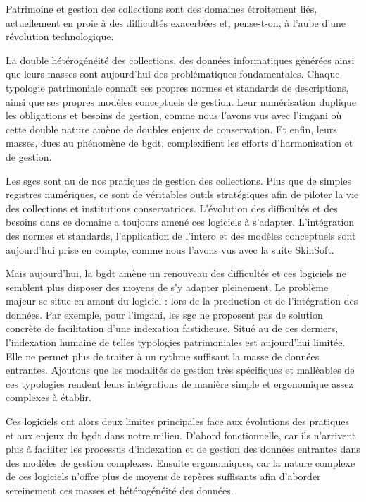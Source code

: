 
Patrimoine et gestion des collections sont des domaines étroitement liés, actuellement en proie à des difficultés exacerbées et, pense-t-on, à l'aube d'une révolution technologique. 

La double hétérogénéité des collections, des données informatiques générées ainsi que leurs masses sont aujourd'hui des problématiques fondamentales. Chaque typologie patrimoniale connaît ses propres normes et standards de descriptions, ainsi que ses propres modèles conceptuels de gestion. Leur numérisation duplique les obligations et besoins de gestion, comme nous l'avons vus avec l'\gls{imgani} où cette double nature amène de doubles enjeux de conservation. Et enfin, leurs masses, dues au phénomène de \gls{bgdt}, complexifient les efforts d'harmonisation et de gestion. 

Les \glspl{sgc} sont au \coeur de nos pratiques de gestion des collections. Plus que de simples registres numériques, ce sont de véritables outils stratégiques afin de piloter la vie des collections et institutions conservatrices. L'évolution des difficultés et des besoins dans ce domaine a toujours amené ces logiciels à s'adapter. L'intégration des normes et standards, l’application de l'\gls{intero} et des modèles conceptuels sont aujourd'hui prise en compte, comme nous l'avons vus avec la suite SkinSoft.

Mais aujourd'hui, la \gls{bgdt} amène un renouveau des difficultés et ces logiciels ne semblent plus disposer des moyens de s'y adapter pleinement. Le problème majeur se situe en amont du logiciel : lors de la production et de l'intégration des données. Par exemple, pour l'\gls{imgani}, les \gls{sgc} ne proposent pas de solution concrète de facilitation d'une indexation fastidieuse. Situé au \coeur de ces derniers, l'indexation humaine de telles typologies patrimoniales est aujourd’hui limitée. Elle ne permet plus de traiter à un rythme suffisant la masse de données entrantes. Ajoutons que les modalités de gestion très spécifiques et malléables de ces typologies rendent leurs intégrations de manière simple et ergonomique assez complexes à établir. 

Ces logiciels ont alors deux limites principales face aux évolutions des pratiques et aux enjeux du \gls{bgdt} dans notre milieu. D'abord fonctionnelle, car ils n'arrivent plus à faciliter les processus d'indexation et de gestion des données entrantes dans des modèles de gestion complexes. Ensuite ergonomiques, car la nature complexe de ces logiciels n'offre plus de moyens de repères suffisants afin d'aborder sereinement ces masses et hétérogénéité des données.\newline

